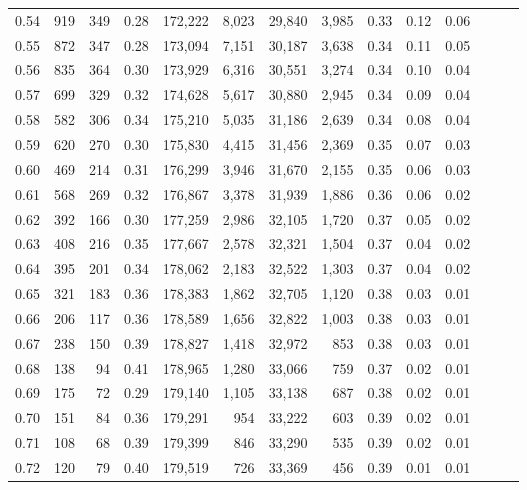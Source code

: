 \begin{tabular}{rrrrrrrrrrrrrr}
0.54 &    919 &    349 &  0.28 &  172,222 &    8,023 &  29,840 &   3,985 &  0.33 &  0.12 &      0.06 \\
0.55 &    872 &    347 &  0.28 &  173,094 &    7,151 &  30,187 &   3,638 &  0.34 &  0.11 &      0.05 \\
0.56 &    835 &    364 &  0.30 &  173,929 &    6,316 &  30,551 &   3,274 &  0.34 &  0.10 &      0.04 \\
0.57 &    699 &    329 &  0.32 &  174,628 &    5,617 &  30,880 &   2,945 &  0.34 &  0.09 &      0.04 \\
0.58 &    582 &    306 &  0.34 &  175,210 &    5,035 &  31,186 &   2,639 &  0.34 &  0.08 &      0.04 \\
0.59 &    620 &    270 &  0.30 &  175,830 &    4,415 &  31,456 &   2,369 &  0.35 &  0.07 &      0.03 \\
0.60 &    469 &    214 &  0.31 &  176,299 &    3,946 &  31,670 &   2,155 &  0.35 &  0.06 &      0.03 \\
0.61 &    568 &    269 &  0.32 &  176,867 &    3,378 &  31,939 &   1,886 &  0.36 &  0.06 &      0.02 \\
0.62 &    392 &    166 &  0.30 &  177,259 &    2,986 &  32,105 &   1,720 &  0.37 &  0.05 &      0.02 \\
0.63 &    408 &    216 &  0.35 &  177,667 &    2,578 &  32,321 &   1,504 &  0.37 &  0.04 &      0.02 \\
0.64 &    395 &    201 &  0.34 &  178,062 &    2,183 &  32,522 &   1,303 &  0.37 &  0.04 &      0.02 \\
0.65 &    321 &    183 &  0.36 &  178,383 &    1,862 &  32,705 &   1,120 &  0.38 &  0.03 &      0.01 \\
0.66 &    206 &    117 &  0.36 &  178,589 &    1,656 &  32,822 &   1,003 &  0.38 &  0.03 &      0.01 \\
0.67 &    238 &    150 &  0.39 &  178,827 &    1,418 &  32,972 &     853 &  0.38 &  0.03 &      0.01 \\
0.68 &    138 &     94 &  0.41 &  178,965 &    1,280 &  33,066 &     759 &  0.37 &  0.02 &      0.01 \\
0.69 &    175 &     72 &  0.29 &  179,140 &    1,105 &  33,138 &     687 &  0.38 &  0.02 &      0.01 \\
0.70 &    151 &     84 &  0.36 &  179,291 &      954 &  33,222 &     603 &  0.39 &  0.02 &      0.01 \\
0.71 &    108 &     68 &  0.39 &  179,399 &      846 &  33,290 &     535 &  0.39 &  0.02 &      0.01 \\
0.72 &    120 &     79 &  0.40 &  179,519 &      726 &  33,369 &     456 &  0.39 &  0.01 &      0.01 \\

\end{tabular}
